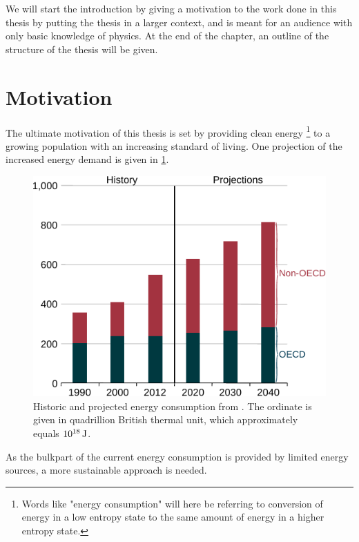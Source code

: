 %
We will start the introduction by giving a motivation to the work done in this thesis by putting the thesis in a larger context, and is meant for an audience with only basic knowledge of physics.
At the end of the chapter, an outline of the structure of the thesis will be given.

\section{Motivation}
%
The ultimate motivation of this thesis is set by providing clean energy%
\footnote{Words like "energy consumption" will here be referring to conversion of energy in a low entropy state to the same amount of energy in a higher entropy state.
}
%
to a growing population with an increasing standard of living.
One projection of the increased energy demand is given in \cref{fig:energyDemand}.
%
\begin{figure}[htb]
    \begin{center}
        \includegraphics{fig/intro/energyDemand}
    \end{center}
    \caption{Historic and projected energy consumption from \cite{UEIA2016book}.
    The ordinate is given in quadrillion British thermal unit, which approximately equals $10^{18} \, \text{J}$.
    }
    \label{fig:energyDemand}
\end{figure}

\noindent
As the bulkpart of the current energy consumption is provided by limited energy sources, a more sustainable approach is needed.

